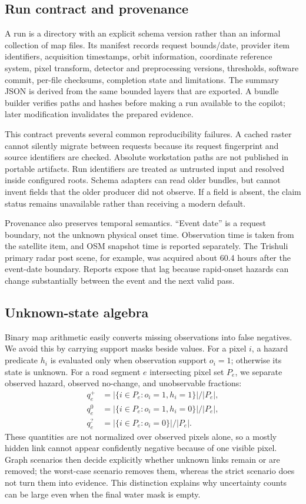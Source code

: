 \documentclass[10pt,twocolumn,letterpaper]{article}
\begin{document}
\subsection{Run contract and provenance}
A run is a directory with an explicit schema version rather than an informal
collection of map files. Its manifest records request bounds/date, provider item
identifiers, acquisition timestamps, orbit information, coordinate reference
system, pixel transform, detector and preprocessing versions, thresholds,
software commit, per-file checksums, completion state and limitations. The
summary JSON is derived from the same bounded layers that are exported. A bundle
builder verifies paths and hashes before making a run available to the copilot;
later modification invalidates the prepared evidence.

This contract prevents several common reproducibility failures. A cached raster
cannot silently migrate between requests because its request fingerprint and
source identifiers are checked. Absolute workstation paths are not published in
portable artifacts. Run identifiers are treated as untrusted input and resolved
inside configured roots. Schema adapters can read older bundles, but cannot
invent fields that the older producer did not observe. If a field is absent, the
claim status remains unavailable rather than receiving a modern default.

Provenance also preserves temporal semantics. ``Event date'' is a request
boundary, not the unknown physical onset time. Observation time is taken from
the satellite item, and OSM snapshot time is reported separately. The Trishuli
primary radar post scene, for example, was acquired about 60.4 hours after the
event-date boundary. Reports expose that lag because rapid-onset hazards can
change substantially between the event and the next valid pass.

\subsection{Unknown-state algebra}
Binary map arithmetic easily converts missing observations into false negatives.
We avoid this by carrying support masks beside values. For a pixel $i$, a hazard
predicate $h_i$ is evaluated only when observation support $o_i=1$; otherwise
its state is unknown. For a road segment $e$ intersecting pixel set $P_e$, we
separate observed hazard, observed no-change, and unobservable fractions:
\begin{align}
q_e^+ &= |\{i\in P_e:o_i=1,h_i=1\}|/|P_e|,\\
q_e^0 &= |\{i\in P_e:o_i=1,h_i=0\}|/|P_e|,\\
q_e^? &= |\{i\in P_e:o_i=0\}|/|P_e|.
\end{align}
These quantities are not normalized over observed pixels alone, so a mostly
hidden link cannot appear confidently negative because of one visible pixel.
Graph scenarios then decide explicitly whether unknown links remain or are
removed; the worst-case scenario removes them, whereas the strict scenario does
not turn them into evidence. This distinction explains why uncertainty counts
can be large even when the final water mask is empty.
\end{document}
